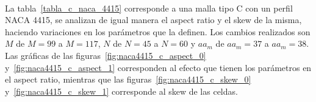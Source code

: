 \documentclass[letterpaper, openright, 12pt]{book}
\begin{document}
    \paragraph*{}
    La tabla~\ref{tabla_c_naca_4415} corresponde a una malla tipo C con un
    perfil NACA 4415, se analizan de igual manera el aspect ratio y el skew de
    la misma, haciendo variaciones en los parámetros que la definen. Los cambios
    realizados son $M$ de $M=99$ a $M=117$, $N$ de $N=45$ a $N=60$ y $aa_{m}$ de
    $aa_{m} = 37$ a $aa_{m}=38$. Las gráficas de las
    figuras~\ref{fig:naca4415_c_aspect_0} y~\ref{fig:naca4415_c_aspect_1}
    corresponden al efecto que tienen los parámetros en el aspect ratio,
    mientras que las figuras~\ref{fig:naca4415_c_skew_0}
    y~\ref{fig:naca4415_c_skew_1} corresponde al skew de las celdas.

    \begin{figure}[H]
        \centering



\end{figure}
\end{document}
